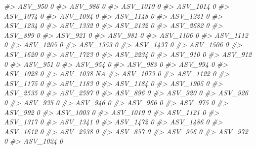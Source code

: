 \documentclass[
]{article}
\newenvironment{Shaded}{\begin{snugshade}}{\end{snugshade}}
\newcommand{\CommentTok}[1]{\textcolor[rgb]{0.56,0.35,0.01}{\textit{#1}}}
\begin{document}
\begin{Shaded}
\begin{Highlighting}[]
\CommentTok{\#\textgreater{} ASV\_950   0}
\CommentTok{\#\textgreater{} ASV\_986   0}
\CommentTok{\#\textgreater{} ASV\_1010  0}
\CommentTok{\#\textgreater{} ASV\_1014  0}
\CommentTok{\#\textgreater{} ASV\_1074  0}
\CommentTok{\#\textgreater{} ASV\_1094  0}
\CommentTok{\#\textgreater{} ASV\_1148  0}
\CommentTok{\#\textgreater{} ASV\_1221  0}
\CommentTok{\#\textgreater{} ASV\_1234  0}
\CommentTok{\#\textgreater{} ASV\_1332  0}
\CommentTok{\#\textgreater{} ASV\_2132  0}
\CommentTok{\#\textgreater{} ASV\_2682  0}
\CommentTok{\#\textgreater{} ASV\_899   0}
\CommentTok{\#\textgreater{} ASV\_921   0}
\CommentTok{\#\textgreater{} ASV\_981   0}
\CommentTok{\#\textgreater{} ASV\_1106  0}
\CommentTok{\#\textgreater{} ASV\_1112  0}
\CommentTok{\#\textgreater{} ASV\_1205  0}
\CommentTok{\#\textgreater{} ASV\_1353  0}
\CommentTok{\#\textgreater{} ASV\_1437  0}
\CommentTok{\#\textgreater{} ASV\_1506  0}
\CommentTok{\#\textgreater{} ASV\_1620  0}
\CommentTok{\#\textgreater{} ASV\_1723  0}
\CommentTok{\#\textgreater{} ASV\_2234  0}
\CommentTok{\#\textgreater{} ASV\_910   0}
\CommentTok{\#\textgreater{} ASV\_912   0}
\CommentTok{\#\textgreater{} ASV\_951   0}
\CommentTok{\#\textgreater{} ASV\_954   0}
\CommentTok{\#\textgreater{} ASV\_983   0}
\CommentTok{\#\textgreater{} ASV\_994   0}
\CommentTok{\#\textgreater{} ASV\_1028  0}
\CommentTok{\#\textgreater{} ASV\_1038 NA}
\CommentTok{\#\textgreater{} ASV\_1073  0}
\CommentTok{\#\textgreater{} ASV\_1122  0}
\CommentTok{\#\textgreater{} ASV\_1175  0}
\CommentTok{\#\textgreater{} ASV\_1183  0}
\CommentTok{\#\textgreater{} ASV\_1184  0}
\CommentTok{\#\textgreater{} ASV\_1905  0}
\CommentTok{\#\textgreater{} ASV\_2535  0}
\CommentTok{\#\textgreater{} ASV\_2597  0}
\CommentTok{\#\textgreater{} ASV\_896   0}
\CommentTok{\#\textgreater{} ASV\_920   0}
\CommentTok{\#\textgreater{} ASV\_926   0}
\CommentTok{\#\textgreater{} ASV\_935   0}
\CommentTok{\#\textgreater{} ASV\_946   0}
\CommentTok{\#\textgreater{} ASV\_966   0}
\CommentTok{\#\textgreater{} ASV\_975   0}
\CommentTok{\#\textgreater{} ASV\_992   0}
\CommentTok{\#\textgreater{} ASV\_1003  0}
\CommentTok{\#\textgreater{} ASV\_1019  0}
\CommentTok{\#\textgreater{} ASV\_1121  0}
\CommentTok{\#\textgreater{} ASV\_1317  0}
\CommentTok{\#\textgreater{} ASV\_1341  0}
\CommentTok{\#\textgreater{} ASV\_1472  0}
\CommentTok{\#\textgreater{} ASV\_1486  0}
\CommentTok{\#\textgreater{} ASV\_1612  0}
\CommentTok{\#\textgreater{} ASV\_2538  0}
\CommentTok{\#\textgreater{} ASV\_857   0}
\CommentTok{\#\textgreater{} ASV\_956   0}
\CommentTok{\#\textgreater{} ASV\_972   0}
\CommentTok{\#\textgreater{} ASV\_1024  0}

\end{Highlighting}
\end{Shaded}
\end{document}
